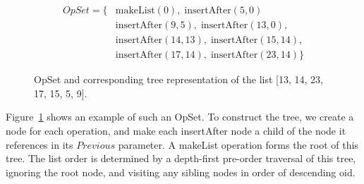 \begin{figure}
\begin{align*}
\mathit{OpSet} = \{ &
    \mathrm{makeList}(0),\; \mathrm{insertAfter}(5, 0) \\ &
    \mathrm{insertAfter}(9, 5),\; \mathrm{insertAfter}(13, 0), \\&
    \mathrm{insertAfter}(14, 13),\; \mathrm{insertAfter}(15, 14), \\&
    \mathrm{insertAfter}(17, 14),\; \mathrm{insertAfter}(23, 14) \}
\end{align*}
\centering
{}
\caption{OpSet and corresponding tree representation of the list [13, 14, 23, 17, 15, 5, 9].}\label{fig:list-tree}
\end{figure}

Figure~\ref{fig:list-tree} shows an example of such an OpSet.
To construct the tree, we create a node for each operation, and make each insertAfter node a child of the node it references in its $\mathit{Previous}$ parameter.
A makeList operation forms the root of this tree.
The list order is determined by a depth-first pre-order traversal of this tree, ignoring the root node, and visiting any sibling nodes in order of descending oid.


